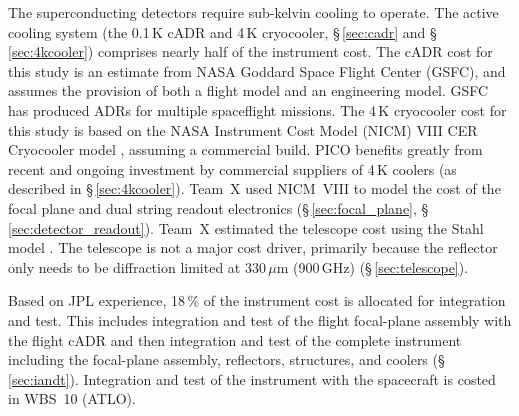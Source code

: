 %
\costfootnote

The superconducting detectors require sub-kelvin cooling to
operate. The active cooling system (the 0.1\,K cADR and 4\,K
cryocooler, \S\,\ref{sec:cadr} and \S\,\ref{sec:4kcooler}) comprises nearly half of the instrument
cost. The cADR cost for this study is an estimate from NASA Goddard
Space Flight Center (GSFC), and assumes the provision of both a flight
model and an engineering model. GSFC has produced ADRs for multiple
spaceflight missions. The 4\,K cryocooler cost for this study is based
on the NASA Instrument Cost Model (NICM) VIII CER Cryocooler model
\cite{Mrozinski2017}, assuming a commercial build. PICO benefits
greatly from recent and ongoing investment by commercial suppliers of
4\,K coolers (as described in \S\,\ref{sec:4kcooler}).  Team~X used NICM~VIII to model
the cost of the focal plane and dual string readout electronics (\S\,\ref{sec:focal_plane},
\S\,\ref{sec:detector_readout}).  Team~X estimated the telescope cost using the Stahl model
\cite{Stahl2016}. The telescope is not a major cost driver, primarily
because the reflector only needs to be diffraction limited at 330\,$\mu$m
(900\,GHz) (\S\,\ref{sec:telescope}).

Based on JPL experience, 18\,\% of the instrument cost is allocated
for integration and test. This includes integration and test of the
flight focal-plane assembly with the flight cADR and then integration
and test of the complete instrument including the focal-plane
assembly, reflectors, structures, and coolers (\S\,\ref{sec:iandt}). Integration and
test of the instrument with the spacecraft is costed in WBS~10
(ATLO).
\costfootnote

